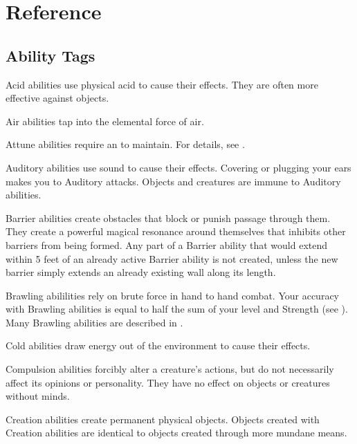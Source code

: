 \chapter{Reference}\label{Reference}

\section{Ability Tags}\label{Ability Tags}

   Acid abilities use physical acid to cause their effects.
  They are often more effective against objects.

   Air abilities tap into the elemental force of air.

   Attune abilities require an  to maintain.
  For details, see .

   Auditory abilities use sound to cause their effects.
  Covering or plugging your ears makes you \impervious to Auditory attacks.
  Objects and \deafened creatures are immune to Auditory abilities.

   Barrier abilities create obstacles that block or punish passage through them.
  They create a powerful magical resonance around themselves that inhibits other barriers from being formed.
  Any part of a Barrier ability that would extend within 5 feet of an already active Barrier ability is not created, unless the new barrier simply extends an already existing wall along its length.

   Brawling abililities rely on brute force in hand to hand combat.
  Your accuracy with Brawling abilities is equal to half the sum of your level and Strength (see ).
  Many Brawling abilities are described in .

   Cold abilities draw energy out of the environment to cause their effects.

   Compulsion abilities forcibly alter a creature's actions, but do not necessarily affect its opinions or personality.
  They have no effect on objects or creatures without minds.

   Creation abilities create permanent physical objects.
  Objects created with Creation abilities are identical to objects created through more mundane means.

